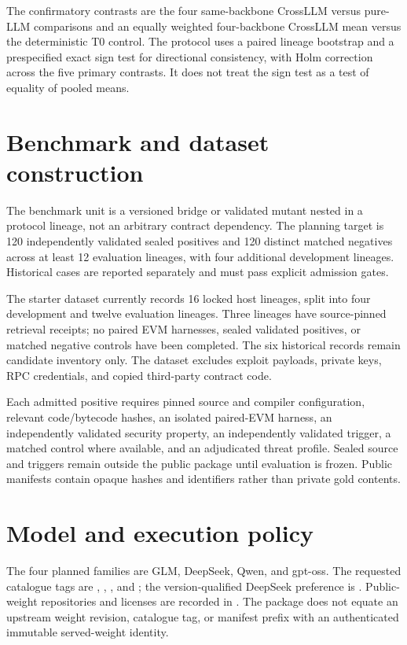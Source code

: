 \documentclass[11pt,a4paper]{article}
\begin{document}
The confirmatory contrasts are the four same-backbone CrossLLM versus pure-LLM comparisons and an equally weighted four-backbone CrossLLM mean versus the deterministic T0 control. The protocol uses a paired lineage bootstrap and a prespecified exact sign test for directional consistency, with Holm correction across the five primary contrasts. It does not treat the sign test as a test of equality of pooled means.

\section{Benchmark and dataset construction}

The benchmark unit is a versioned bridge or validated mutant nested in a protocol lineage, not an arbitrary contract dependency. The planning target is 120 independently validated sealed positives and 120 distinct matched negatives across at least 12 evaluation lineages, with four additional development lineages. Historical cases are reported separately and must pass explicit admission gates.

The starter dataset currently records 16 locked host lineages, split into four development and twelve evaluation lineages. Three lineages have source-pinned retrieval receipts; no paired EVM harnesses, sealed validated positives, or matched negative controls have been completed. The six historical records remain candidate inventory only. The dataset excludes exploit payloads, private keys, RPC credentials, and copied third-party contract code.

Each admitted positive requires pinned source and compiler configuration, relevant code/bytecode hashes, an isolated paired-EVM harness, an independently validated security property, an independently validated trigger, a matched control where available, and an adjudicated threat profile. Sealed source and triggers remain outside the public package until evaluation is frozen. Public manifests contain opaque hashes and identifiers rather than private gold contents.

\section{Model and execution policy}

The four planned families are GLM, DeepSeek, Qwen, and gpt-oss. The requested catalogue tags are , , , and ; the version-qualified DeepSeek preference is . Public-weight repositories and licenses are recorded in . The package does not equate an upstream weight revision, catalogue tag, or manifest prefix with an authenticated immutable served-weight identity.
\end{document}
